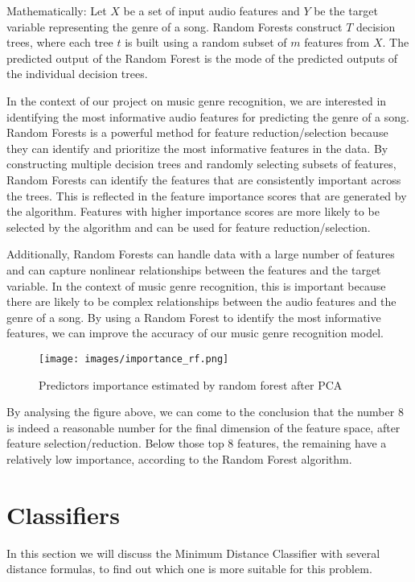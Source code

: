 \documentclass[12pt, a4paper]{article}
\begin{document}
Mathematically:
Let $X$ be a set of input audio features and $Y$ be the target variable representing the genre of a song. Random Forests construct $T$ decision trees, where each tree $t$ is built using a random subset of $m$ features from $X$. The predicted output of the Random Forest is the mode of the predicted outputs of the individual decision trees. 

In the context of our project on music genre recognition, we are interested in identifying the most informative audio features for predicting the genre of a song. Random Forests is a powerful method for feature reduction/selection because they can identify and prioritize the most informative features in the data. By constructing multiple decision trees and randomly selecting subsets of features, Random Forests can identify the features that are consistently important across the trees. This is reflected in the feature importance scores that are generated by the algorithm. Features with higher importance scores are more likely to be selected by the algorithm and can be used for feature reduction/selection.

Additionally, Random Forests can handle data with a large number of features and can capture nonlinear relationships between the features and the target variable. In the context of music genre recognition, this is important because there are likely to be complex relationships between the audio features and the genre of a song. By using a Random Forest to identify the most informative features, we can improve the accuracy of our music genre recognition model.

\begin{figure}[H]
\centering
\texttt{[image: images/importance\_rf.png]}
\caption{Predictors importance estimated by random forest after PCA}
\label{fig:myimage}
\end{figure}

By analysing the figure above, we can come to the conclusion that the number 8 is indeed a reasonable number for the final dimension of the feature space, after feature selection/reduction. Below those top 8 features, the remaining have a relatively low importance, according to the Random Forest algorithm.

\section{Classifiers}
In this section we will discuss the Minimum Distance Classifier with several distance formulas, to find out which one is more suitable for this problem.
\end{document}
